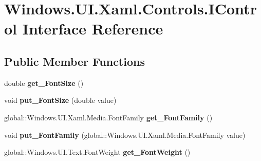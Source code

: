 \hypertarget{interface_windows_1_1_u_i_1_1_xaml_1_1_controls_1_1_i_control}{}\section{Windows.\+U\+I.\+Xaml.\+Controls.\+I\+Control Interface Reference}
\label{interface_windows_1_1_u_i_1_1_xaml_1_1_controls_1_1_i_control}
\subsection*{Public Member Functions}
\begin{DoxyCompactItemize}
\item 
\mbox{\label{interface_windows_1_1_u_i_1_1_xaml_1_1_controls_1_1_i_control_a9388b2d1fe635f428cae07d67c0a8aaf}} 
double {\bfseries get\+\_\+\+Font\+Size} ()
\item 
\mbox{\label{interface_windows_1_1_u_i_1_1_xaml_1_1_controls_1_1_i_control_a34a055aa84a0508191429e20453c5ce0}} 
void {\bfseries put\+\_\+\+Font\+Size} (double value)
\item 
\mbox{\label{interface_windows_1_1_u_i_1_1_xaml_1_1_controls_1_1_i_control_a689d7b84c03cb8baa86aef968c2f78e5}} 
global\+::\+Windows.\+U\+I.\+Xaml.\+Media.\+Font\+Family {\bfseries get\+\_\+\+Font\+Family} ()
\item 
\mbox{\label{interface_windows_1_1_u_i_1_1_xaml_1_1_controls_1_1_i_control_a9026d2ca28dbe0834360260903186536}} 
void {\bfseries put\+\_\+\+Font\+Family} (global\+::\+Windows.\+U\+I.\+Xaml.\+Media.\+Font\+Family value)
\item 
\mbox{\label{interface_windows_1_1_u_i_1_1_xaml_1_1_controls_1_1_i_control_a72747904d83bab3de0891c213aa46602}} 
global\+::\+Windows.\+U\+I.\+Text.\+Font\+Weight {\bfseries get\+\_\+\+Font\+Weight} ()
\item 
\mbox{\label{interface_windows_1_1_u_i_1_1_xaml_1_1_controls_1_1_i_control_a50f45e373b66a5b092b6464b5dbd94bf}} 

\end{DoxyCompactItemize}
